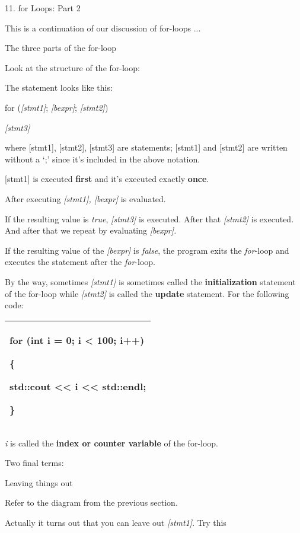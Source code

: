 \documentclass[
]{article}
\author{}
\date{}
\begin{document}
11. for Loops: Part 2

This is a continuation of our discussion of for-loops ...

The three parts of the for-loop

Look at the structure of the for-loop:

The statement looks like this:

for (\emph{{[}stmt1{]}}; \emph{{[}bexpr{]}}; \emph{{[}stmt2{]}})

\emph{{[}stmt3{]}}

where {[}stmt1{]}, {[}stmt2{]}, {[}stmt3{]} are statements; {[}stmt1{]}
and {[}stmt2{]} are written without a `;' since it's included in the
above notation.

{[}stmt1{]} is executed \textbf{first} and it's executed exactly
\textbf{once}.

After executing \emph{{[}stmt1{]}, {[}bexpr{]}} is evaluated.

If the resulting value is \emph{true}, \emph{{[}stmt3{]}} is executed.
After that \emph{{[}stmt2{]}} is executed. And after that we repeat by
evaluating \emph{{[}bexpr{]}.}

If the resulting value of the \emph{{[}bexpr{]}} is \emph{false}, the
program exits the \emph{for}-loop and executes the statement after the
\emph{for}-loop.

By the way, sometimes \emph{{[}stmt1{]}} is sometimes called the
\textbf{initialization} statement of the for-loop while
\emph{{[}stmt2{]}} is called the \textbf{update} statement. For the
following code:

\begin{longtable}[]{@{}l@{}}
\toprule
\endhead
\begin{minipage}[t]{0.97\columnwidth}\raggedright
for (int i = 0; i \textless{} 100; i++)

\{

std::cout \textless\textless{} i \textless\textless{} std::endl;

\}\strut
\end{minipage}\tabularnewline
\bottomrule
\end{longtable}

\emph{i} is called the \textbf{index or counter variable} of the
for-loop.

Two final terms:

Leaving things out

Refer to the diagram from the previous section.

Actually it turns out that you can leave out \emph{{[}stmt1{]}}. Try
this
\end{document}
